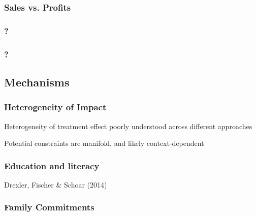 \documentclass[hideothersubsections, usenames,dvipsnames,10pt]{beamer}
\newenvironment{itemize_3pt}{\itemize\addtolength{\itemsep}{3pt}}{\enditemize}
\begin{document}
\begin{frame}
\frametitle{Sales vs. Profits}
	\begin{itemize_3pt}
	\item 
	\vspace{0.1in}
	\end{itemize_3pt}
\end{frame}


\begin{frame}
\frametitle{?}
	\begin{itemize_3pt}
	\item 
	\vspace{0.1in}
	\end{itemize_3pt}
\end{frame}

\begin{frame}
\frametitle{?}
	\begin{itemize_3pt}
	\item 
	\vspace{0.1in}
	\end{itemize_3pt}
\end{frame}


\subsection{Mechanisms}

\begin{frame}
\frametitle{Heterogeneity of Impact}
	\begin{itemize_3pt}
	\item Heterogeneity of treatment effect poorly understood across different approaches
	\item Potential constraints are manifold, and likely context-dependent
	\vspace{0.1in}
	\end{itemize_3pt}
\end{frame}

\begin{frame}
\frametitle{Education and literacy}
	\begin{itemize_3pt}
	\item Drexler, Fischer \& Schoar (2014)
	\vspace{0.1in}
	\end{itemize_3pt}
\end{frame}

\begin{frame}
\frametitle{Family Commitments}
	\begin{itemize_3pt}
	\item 
	\vspace{0.1in}
	\end{itemize_3pt}
\end{frame}
\end{document}
